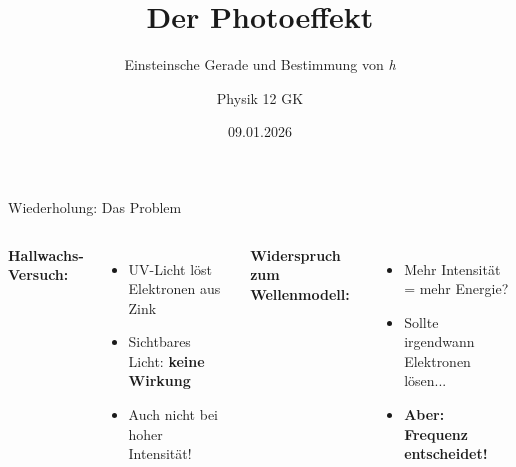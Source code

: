 \documentclass[aspectratio=169,11pt]{beamer}
\title{Der Photoeffekt}
\subtitle{Einsteinsche Gerade und Bestimmung von \textit{h}}
\author{Physik 12 GK}
\date{09.01.2026}
\begin{document}
\begin{frame}
\titlepage
\end{frame}

\begin{frame}{Wiederholung: Das Problem}

\begin{columns}
\textbf{Hallwachs-Versuch:}
\begin{itemize}
    \item UV-Licht löst Elektronen aus Zink
    \item Sichtbares Licht: \textbf{keine Wirkung}
    \item Auch nicht bei hoher Intensität!
\end{itemize}

\vspace{1em}
\textbf{Widerspruch zum Wellenmodell:}
\begin{itemize}
    \item Mehr Intensität = mehr Energie?
    \item Sollte irgendwann Elektronen lösen...
    \item \textbf{Aber: Frequenz entscheidet!}
\end{itemize}

\end{columns}

\end{frame}
\end{document}
